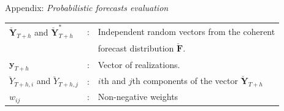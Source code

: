 \documentclass[11pt,xcolor=dvipsnames,handout]{beamer}
\begin{document}
\begin{frame}[noframenumbering]{Appendix: \textit{Probabilistic forecasts evaluation}}
\begin{itemize}
\begin{block}{}
	\end{block}
	\begin{table}
		\small
		\centering %
		\begin{tabular}{lll}
			\toprule
			$\breve{\bm{Y}}_{T+h}$ and $\breve{\bm{Y}}^*_{T+h}$ & : & Independent random vectors from the coherent \\
			& & forecast distribution $\breve{\bm{F}}$.\\
			$\bm{y}_{T+h}$ & : &Vector of realizations. \\
			$\breve{Y}_{T+h,i}$ and $\breve{Y}_{T+h,j}$ & : & $i$th and $j$th components of the vector $\breve{\bm{Y}}_{T+h}$ \\
			$w_{ij}$ & : & Non-negative weights\\
			\bottomrule
		\end{tabular}
	\end{table}
	
\end{itemize}

\end{frame}

%	
\end{document}
